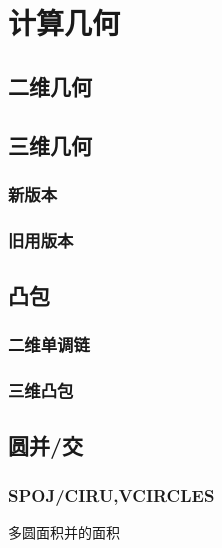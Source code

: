 
\section{计算几何}

\subsection{二维几何}

\subsection{三维几何}
\subsubsection{新版本}

\subsubsection{旧用版本}


\subsection{凸包}
\subsubsection{二维单调链}

\subsubsection{三维凸包}


\subsection{圆并/交}
\subsubsection{SPOJ/CIRU,VCIRCLES}
多圆面积并的面积

